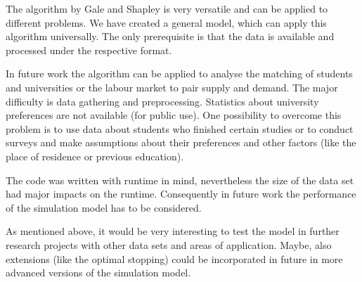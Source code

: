\label{summary}
The algorithm by Gale and Shapley is very versatile and can be applied to different problems.
We have created a general model, which can apply this algorithm universally.
The only prerequisite is that the data is available and processed under the respective format.

In future work the algorithm can be applied to analyse the matching of students and universities or the labour market to pair supply and demand.
The major difficulty is data gathering and preprocessing. 
Statistics about university preferences are not available (for public use).
One possibility to overcome this problem is to use data about students who finished certain studies or to conduct surveys and make assumptions about their preferences and other factors (like the place of residence or previous education).

The code was written with runtime in mind, nevertheless the size of the data set had major impacts on the runtime.
Consequently in future work the performance of the simulation model has to be considered.

As mentioned above, it would be very interesting to test the model in further research projects with other data sets and areas of application.
Maybe, also extensions (like the optimal stopping) could be incorporated in future in more advanced versions of the simulation model.
